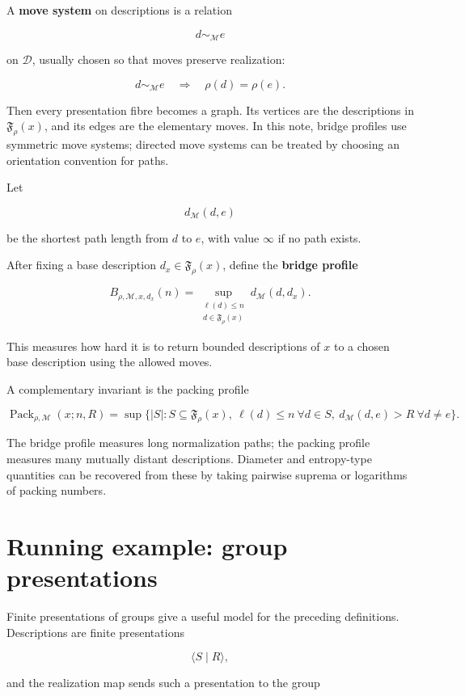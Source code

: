 \documentclass[11pt]{article}
\begin{document}
A \textbf{move system} on descriptions is a relation

\[
d\sim_{\mathcal M} e
\]

on \(\mathcal D\), usually chosen so that moves preserve realization:

\[
d\sim_{\mathcal M} e
\quad\Longrightarrow\quad
\rho(d)=\rho(e).
\]

Then every presentation fibre becomes a graph. Its vertices are the descriptions in \(\mathfrak F_\rho(x)\), and its edges are the elementary moves. In this note, bridge profiles use symmetric move systems; directed move systems can be treated by choosing an orientation convention for paths.

Let

\[
d_{\mathcal M}(d,e)
\]

be the shortest path length from \(d\) to \(e\), with value \(\infty\) if no path exists.

After fixing a base description \(d_x\in\mathfrak F_\rho(x)\), define the \textbf{bridge profile}

\[
B_{\rho,\mathcal M,x,d_x}(n)=
\sup_{\substack{\ell(d)\leq n\\ d\in\mathfrak F_\rho(x)}}
d_{\mathcal M}(d,d_x).
\]

This measures how hard it is to return bounded descriptions of \(x\) to a chosen base description using the allowed moves.

A complementary invariant is the packing profile

\[
\operatorname{Pack}_{\rho,\mathcal M}(x;n,R)
=
\sup\{|S|:S\subseteq\mathfrak F_\rho(x),\ \ell(d)\leq n\ \forall d\in S,\ d_{\mathcal M}(d,e)>R\ \forall d\neq e\}.
\]

The bridge profile measures long normalization paths; the packing profile measures many mutually distant descriptions. Diameter and entropy-type quantities can be recovered from these by taking pairwise suprema or logarithms of packing numbers.


\section{Running example: group presentations}

Finite presentations of groups give a useful model for the preceding definitions. Descriptions are finite presentations

\[
\langle S\mid R\rangle,
\]

and the realization map sends such a presentation to the group
\end{document}
